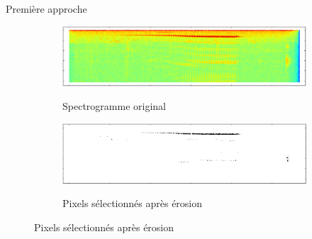 \documentclass[compress,xcolor=table]{beamer}
\begin{document}
\begin{frame}{Première approche}

    \begin{figure}[ht]
        \centering
        \begin{subfigure}[b]{0.45\textwidth}
            \centering
            \caption*{Spectrogramme original}
            \includegraphics[width=\textwidth]{../images/chunks.original_spectrogram.png}
            \label{fig:chunks.original_spectrogram}
        \end{subfigure}
        \hfill
        \begin{subfigure}[b]{0.45\textwidth}
            \centering
            \caption*{Pixels sélectionnés après érosion}
            \includegraphics[width=\textwidth]{../images/chunks.selected_pixels_after_erosion.png}
            \label{fig:chunks.selected_pixels_after_erosion}
        \end{subfigure}

        \vspace{0.5cm}


\end{figure}
\end{frame}
\end{document}
